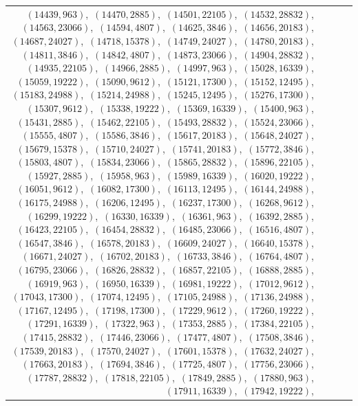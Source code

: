 \documentclass[11pt]{article}
\begin{document}
\begin{longtable}{@{}rrl>{\raggedright\arraybackslash}p{}@{}}
$(14439,963)$,\allowbreak\ $(14470,2885)$,\allowbreak\ $(14501,22105)$,\allowbreak\ $(14532,28832)$,\allowbreak\ $(14563,23066)$,\allowbreak\ $(14594,4807)$,\allowbreak\ $(14625,3846)$,\allowbreak\ $(14656,20183)$,\allowbreak\ $(14687,24027)$,\allowbreak\ $(14718,15378)$,\allowbreak\ $(14749,24027)$,\allowbreak\ $(14780,20183)$,\allowbreak\ $(14811,3846)$,\allowbreak\ $(14842,4807)$,\allowbreak\ $(14873,23066)$,\allowbreak\ $(14904,28832)$,\allowbreak\ $(14935,22105)$,\allowbreak\ $(14966,2885)$,\allowbreak\ $(14997,963)$,\allowbreak\ $(15028,16339)$,\allowbreak\ $(15059,19222)$,\allowbreak\ $(15090,9612)$,\allowbreak\ $(15121,17300)$,\allowbreak\ $(15152,12495)$,\allowbreak\ $(15183,24988)$,\allowbreak\ $(15214,24988)$,\allowbreak\ $(15245,12495)$,\allowbreak\ $(15276,17300)$,\allowbreak\ $(15307,9612)$,\allowbreak\ $(15338,19222)$,\allowbreak\ $(15369,16339)$,\allowbreak\ $(15400,963)$,\allowbreak\ $(15431,2885)$,\allowbreak\ $(15462,22105)$,\allowbreak\ $(15493,28832)$,\allowbreak\ $(15524,23066)$,\allowbreak\ $(15555,4807)$,\allowbreak\ $(15586,3846)$,\allowbreak\ $(15617,20183)$,\allowbreak\ $(15648,24027)$,\allowbreak\ $(15679,15378)$,\allowbreak\ $(15710,24027)$,\allowbreak\ $(15741,20183)$,\allowbreak\ $(15772,3846)$,\allowbreak\ $(15803,4807)$,\allowbreak\ $(15834,23066)$,\allowbreak\ $(15865,28832)$,\allowbreak\ $(15896,22105)$,\allowbreak\ $(15927,2885)$,\allowbreak\ $(15958,963)$,\allowbreak\ $(15989,16339)$,\allowbreak\ $(16020,19222)$,\allowbreak\ $(16051,9612)$,\allowbreak\ $(16082,17300)$,\allowbreak\ $(16113,12495)$,\allowbreak\ $(16144,24988)$,\allowbreak\ $(16175,24988)$,\allowbreak\ $(16206,12495)$,\allowbreak\ $(16237,17300)$,\allowbreak\ $(16268,9612)$,\allowbreak\ $(16299,19222)$,\allowbreak\ $(16330,16339)$,\allowbreak\ $(16361,963)$,\allowbreak\ $(16392,2885)$,\allowbreak\ $(16423,22105)$,\allowbreak\ $(16454,28832)$,\allowbreak\ $(16485,23066)$,\allowbreak\ $(16516,4807)$,\allowbreak\ $(16547,3846)$,\allowbreak\ $(16578,20183)$,\allowbreak\ $(16609,24027)$,\allowbreak\ $(16640,15378)$,\allowbreak\ $(16671,24027)$,\allowbreak\ $(16702,20183)$,\allowbreak\ $(16733,3846)$,\allowbreak\ $(16764,4807)$,\allowbreak\ $(16795,23066)$,\allowbreak\ $(16826,28832)$,\allowbreak\ $(16857,22105)$,\allowbreak\ $(16888,2885)$,\allowbreak\ $(16919,963)$,\allowbreak\ $(16950,16339)$,\allowbreak\ $(16981,19222)$,\allowbreak\ $(17012,9612)$,\allowbreak\ $(17043,17300)$,\allowbreak\ $(17074,12495)$,\allowbreak\ $(17105,24988)$,\allowbreak\ $(17136,24988)$,\allowbreak\ $(17167,12495)$,\allowbreak\ $(17198,17300)$,\allowbreak\ $(17229,9612)$,\allowbreak\ $(17260,19222)$,\allowbreak\ $(17291,16339)$,\allowbreak\ $(17322,963)$,\allowbreak\ $(17353,2885)$,\allowbreak\ $(17384,22105)$,\allowbreak\ $(17415,28832)$,\allowbreak\ $(17446,23066)$,\allowbreak\ $(17477,4807)$,\allowbreak\ $(17508,3846)$,\allowbreak\ $(17539,20183)$,\allowbreak\ $(17570,24027)$,\allowbreak\ $(17601,15378)$,\allowbreak\ $(17632,24027)$,\allowbreak\ $(17663,20183)$,\allowbreak\ $(17694,3846)$,\allowbreak\ $(17725,4807)$,\allowbreak\ $(17756,23066)$,\allowbreak\ $(17787,28832)$,\allowbreak\ $(17818,22105)$,\allowbreak\ $(17849,2885)$,\allowbreak\ $(17880,963)$,\allowbreak\ $(17911,16339)$,\allowbreak\ $(17942,19222)$,\allowbreak\ 
\end{longtable}
\end{document}
